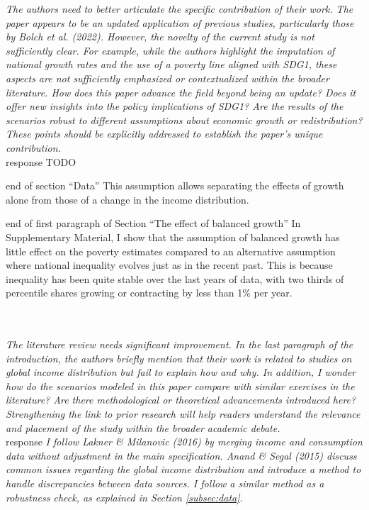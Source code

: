 \documentclass[12pt,english]{article}
\begin{document}
\textit{The authors need to better articulate the specific contribution of their work. The paper appears to be an updated application of previous studies, particularly those by Bolch et al. (2022). However, the novelty of the current study is not sufficiently clear. For example, while the authors highlight the imputation of national growth rates and the use of a poverty line aligned with SDG1, these aspects are not sufficiently emphasized or contextualized within the broader literature. How does this paper advance the field beyond being an update? Does it offer new insights into the policy implications of SDG1? Are the results of the scenarios robust to different assumptions about economic growth or redistribution? These points should be explicitly addressed to establish the paper's unique contribution. }~\\

response TODO

end of section ``Data''
This assumption allows separating the effects of growth alone from those of a change in the income distribution. 

end of first paragraph of Section ``The effect of balanced growth''
In Supplementary Material, I show that the assumption of balanced growth has little effect on the poverty estimates compared to an alternative assumption where national inequality evolves just as in the recent past. This is because inequality has been quite stable over the last years of data, with two thirds of percentile shares growing or contracting by less than 1\% per year.

~\\ ~\\

\textit{The literature review needs significant improvement. In the last paragraph of the introduction, the authors briefly mention that their work is related to studies on global income distribution but fail to explain how and why. In addition, I wonder how do the scenarios modeled in this paper compare with similar exercises in the literature? Are there methodological or theoretical advancements introduced here? Strengthening the link to prior research will help readers understand the relevance and placement of the study within the broader academic debate. }~\\

response
\textit{I follow Lakner \& Milanovic (2016) by merging income and consumption data without adjustment in the main specification. 
Anand \& Segal (2015) discuss common issues regarding the global income distribution and introduce a method to handle discrepancies between data sources. I follow a similar method as a robustness check, as explained in Section \ref{subsec:data}. }
~\\ ~\\
\end{document}
